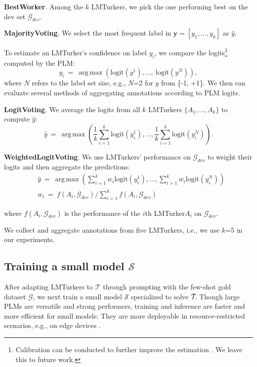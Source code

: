 \documentclass[11pt]{article}
\DeclareMathOperator*{\argmax}{arg\,max}
\def\tasksymbol{$\mathcal{T\mkern-5mu}$\xspace}
\def\mdr{LMTurker\xspace}
\def\mdrs{LMTurkers\xspace}
\def\seclabel#1{\label{sec:#1}}
\begin{document}
\textbf{BestWorker}.
Among the $k$ \mdrs,
we pick the one
performing best on the dev set $\mathcal{G}_{dev}$.



\textbf{MajorityVoting}.
We select the
most frequent
label in
$\mathbf{y} = [y_1, ..., y_k]$
as $\hat{y}$.


To estimate
an \mdr's confidence on label $y_i$,
we compare the
logits\footnote{
  Calibration can be conducted to
  further improve the estimation
  \citep{guo2017calibration}.
  We leave this to future work.
} computed by the  PLM:
$${\scriptstyle y_i \ =\  \argmax(\text{logit}(y^1),...,\ \text{logit}(y^N)) ,}$$
\noindent where
$N$ refers to the label set size,
e.g., $N$=2 for $y$ from \{-1, +1\}.
We then can evaluate several methods of
aggregating annotations according to 
PLM logits.

\textbf{LogitVoting}.
We average the logits from all  $k$ \mdrs
$\{A_1, ..., A_k\}$
to compute $\hat{y}$:
$${\scriptstyle \hat{y}\ =\ \argmax(\frac{1}{k}\sum_{i=1}^k\text{logit}(y^1_i),...,\frac{1}{k}\sum_{i=1}^k\text{logit}(y^N_i))}.$$


\textbf{WeightedLogitVoting}.
We use \mdrs' performance on $\mathcal{G}_{dev}$ 
to weight their logits and then aggregate the
predictions:
\begin{eqnarray*}
&{\scriptstyle \hat{y}\ =\ \argmax(\sum_{i=1}^kw_i\text{logit}(y^1_i),...,\sum_{i=1}^kw_i\text{logit}(y^N_i))} \\
&{\scriptstyle w_i\ =\ f(A_i, \mathcal{G}_{dev}) / \sum_{i=1}^k f(A_i, \mathcal{G}_{dev})}  
\end{eqnarray*}


\noindent where $f(A_i, \mathcal{G}_{dev})$ is the
performance of the 
$i$th \mdr $A_i$ on $\mathcal{G}_{dev}$.


We collect and aggregate annotations
from five \mdrs, 
i.e., we use $k$=5 in our experiments.



\subsection{Training a small model $\mathcal{S}$}
\seclabel{methodtrainingsmall}
After adapting \mdrs to $\mathcal{T}$
through prompting with the
few-shot gold dataset $\mathcal{G}$,
we next train a small model
$\mathcal{S}$
specialized to solve \tasksymbol.
Though large PLMs
are versatile and strong performers,
training and inference 
are faster and more
efficient for small models: They are more
deployable in resource-restricted
scenarios, e.g., on
edge devices \citep{jiao-etal-2020-tinybert}.
\end{document}
